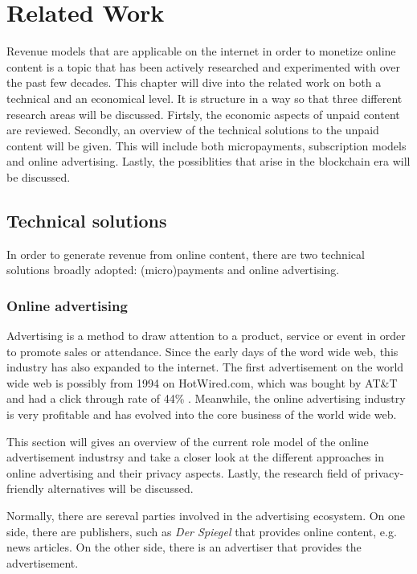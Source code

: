 \chapter{Related Work}
\label{cha:relatedwork}

Revenue models that are applicable on the internet in order to monetize online content is a topic that has been actively researched and experimented with over the past few decades. This chapter will dive into the related work on both a technical and an economical level. It is structure in a way so that three different research areas will be discussed. Firtsly, the economic aspects of unpaid content are reviewed. Secondly, an overview of the technical solutions to the unpaid content will be given. This will include both micropayments, subscription models and online advertising. Lastly, the possiblities that arise in the blockchain era will be discussed.


\section{Technical solutions}

In order to generate revenue from online content, there are two technical solutions broadly adopted: (micro)payments and online advertising. 

\subsection{Online advertising}
Advertising is a method to draw attention to a product, service or event in order to promote sales or attendance. Since the early days of the word wide web, this industry has also expanded to the internet. The first advertisement on the world wide web is possibly from 1994 on HotWired.com, which was bought by AT\&T and had a click through rate of 44\% \cite{firstbanner}. Meanwhile, the online advertising industry is very profitable and has evolved into the core business of the world wide web.

This section will gives an overview of the current role model of the online advertisement industrsy and take a closer look at the different approaches in online advertising and their privacy aspects. Lastly, the research field of privacy-friendly alternatives will be discussed. 

Normally, there are sereval parties involved in the advertising ecosystem. On one side, there are publishers, such as \textit{Der Spiegel} that provides online content, e.g. news articles. On the other side, there is an advertiser that provides the advertisement.

